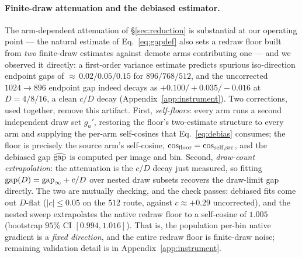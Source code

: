 \paragraph{Finite-draw attenuation and the debiased estimator.}
The arm-dependent attenuation of \S\ref{sec:reduction} is
substantial at our operating point — the natural estimate of
Eq.~\ref{eq:gapdef} also sets a redraw floor built from \emph{two}
finite-draw estimates against demote arms contributing one — and we
observed it directly: a first-order variance estimate predicts
spurious iso-direction endpoint gaps of
${\approx}\,0.02/0.05/0.15$ for $896/768/512$, and the uncorrected
$1024{\to}896$ endpoint gap indeed decays as
${+}0.100/{+}0.035/{-}0.016$ at $D = 4/8/16$, a clean $c/D$ decay
(Appendix~\ref{app:instrument}). Two corrections, used together,
remove this artifact. First, \emph{self-floors}: every arm runs a second
independent draw set $g_a'$, restoring the floor's two-estimate
structure to every arm and supplying the per-arm self-cosines that
Eq.~\ref{eq:debias} consumes; the floor is precisely the source
arm's self-cosine, $\cos_{\mathrm{floor}} = \cos_{\mathrm{self},\mathrm{src}}$,
and the debiased gap $\widehat{\mathrm{gap}}$ is computed per image and bin. Second,
\emph{draw-count extrapolation}: the attenuation is the $c/D$ decay
just measured, so fitting $\mathrm{gap}(D) = \mathrm{gap}_\infty + c/D$ over nested
draw subsets recovers the draw-limit gap directly. The two are
mutually checking, and the check passes: debiased fits come out
$D$-flat ($|c| \le 0.05$ on the $512$ route, against
$c \approx +0.29$ uncorrected), and the nested sweep extrapolates the
native redraw floor to a self-cosine of $1.005$ (bootstrap $95\%$ CI
$[0.994, 1.016]$). That is, the population per-bin native gradient is
a \emph{fixed direction}, and the entire redraw floor is finite-draw
noise; remaining validation detail is in
Appendix~\ref{app:instrument}.

